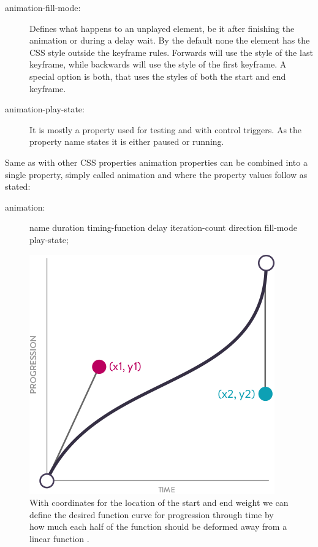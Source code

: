 \begin{description}
\item [animation-fill-mode:] Defines what happens to an unplayed element, be it after finishing the animation or during a delay wait. By the default none the element has the CSS style outside the keyframe rules. Forwards will use the style of the last keyframe, while backwards will use the style of the first keyframe. A special option is both, that uses the styles of both the start and end keyframe.
\item [animation-play-state:] It is mostly a property used for testing and with control triggers. As the property name states it is either paused or running.
\end{description}

Same as with other CSS properties animation properties can be combined into a single property, simply called animation and where the property values follow as stated:

\begin{description}
\item [animation:] name duration timing-function delay iteration-count direction fill-mode play-state;
\end{description}

\begin{figure}[tp]
\centering
\includegraphics[keepaspectratio,width=\hsize,height=\halfh]
{images/cubicBezier.png}

\caption[Cubic-bezier Function]{
With coordinates for the location of the start and end weight we can define the desired function curve for progression through time by how much each half of the function should be deformed away from a linear function \citep{head2016designing}.
}
\label{fig:curve}
\end{figure}

